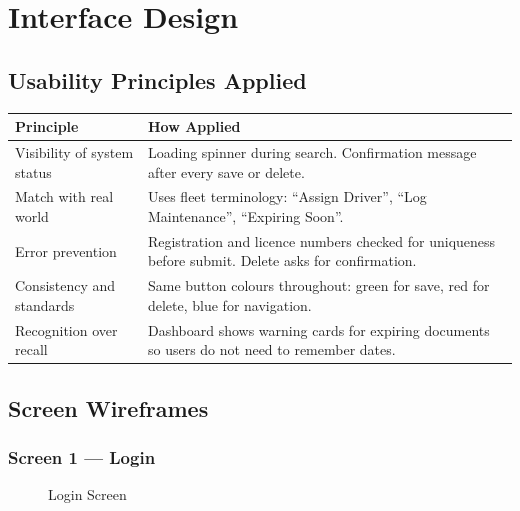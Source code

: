 \documentclass[11pt,a4paper]{article}
\begin{document}
\section{Interface Design}

\subsection{Usability Principles Applied}

\begin{table}[H]
\centering
\begin{tabularx}{\textwidth}{|p{4cm}|X|}
\hline
\textbf{Principle} & \textbf{How Applied} \\
\hline
Visibility of system status & Loading spinner during search. Confirmation message after every save or delete. \\
\hline
Match with real world & Uses fleet terminology: ``Assign Driver'', ``Log Maintenance'', ``Expiring Soon''. \\
\hline
Error prevention & Registration and licence numbers checked for uniqueness before submit. Delete asks for confirmation. \\
\hline
Consistency and standards & Same button colours throughout: green for save, red for delete, blue for navigation. \\
\hline
Recognition over recall & Dashboard shows warning cards for expiring documents so users do not need to remember dates. \\
\hline
\end{tabularx}
\end{table}

\subsection{Screen Wireframes}

\subsubsection*{Screen 1 --- Login}

\begin{figure}[H]
\centering
{}
\caption{Login Screen}
\end{figure}
\end{document}
